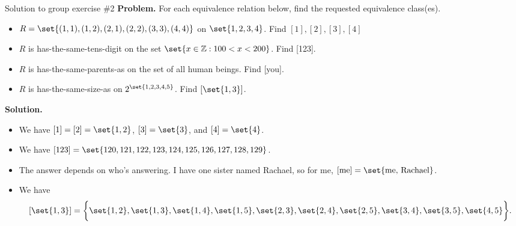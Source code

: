 \documentclass[10pt]{beamer}
\begin{document}
\begin{frame}{Solution to group exercise \#2}
\footnotesize 
\textbf{Problem.} For each equivalence relation below, find the requested equivalence class(es).
	\begin{itemize} \footnotesize 
	\item[a.] $R=\set{(1,1), (1,2), (2,1), (2,2), (3,3), (4,4)} $ on $\set{1,2,3,4}$. Find $[1],[2],[3],[4]$
	\item[b.] $R$ is has-the-same-tens-digit on the set $\set{x \in \mathbb{Z} : 100 < x < 200}$.  Find [123].
	\item[c.] $R$ is has-the-same-parents-as on the set of all human beings.  Find [you].
	\item[d.] $R$ is has-the-same-size-as on $2^{\set{1,2,3,4,5}}$.  Find $[\set{1,3}]$.
	\end{itemize}
\vfill 
\textbf{Solution.} 
	\begin{itemize} \footnotesize 
	\item[a.] We have $[1]=[2]=\set{1,2}$, $[3]=\set{3}$, and $[4]=\set{4}$.
	\item[b.] We have $[123]=\set{120,121,122,123,124,125,126,127,128,129}$.
	\item[c.] The answer depends on who's answering.  I have one sister named Rachael, so for me, $[\text{me}]=\set{\text{me, Rachael}}$.
	\item[d.] We have 
	\[ [\set{1,3}] = \bigg\{ \set{1,2}, \set{1,3}, \set{1,4}, \set{1,5}, \set{2,3}, \set{2,4}, \set{2,5}, \set{3,4}, \set{3,5}, \set{4,5} \bigg\}.\]
	\end{itemize}
\end{frame}

%
\end{document}
